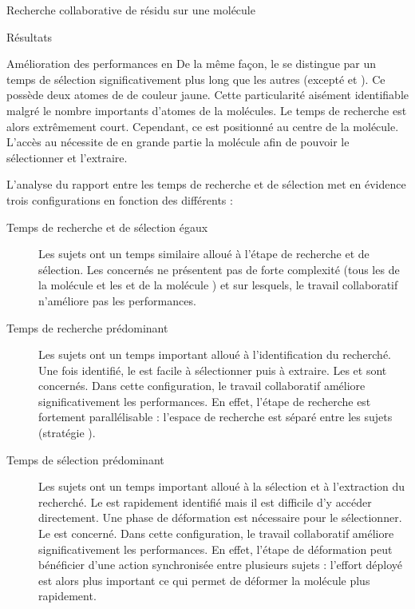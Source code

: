 \documentclass[myfrancais]{mythesis}
\begin{document}
\begin{mychapter}{Recherche collaborative de résidu sur une molécule}
\begin{mysection}{Résultats}
\begin{mysubsection}{Amélioration des performances en }
				De la même façon, le   se distingue par un temps de sélection significativement plus long que les autres  (excepté  et ).
				Ce  possède deux atomes de  de couleur jaune.
				Cette particularité aisément identifiable malgré le nombre importants d'atomes de la molécules.
				Le temps de recherche est alors extrêmement court.
				Cependant, ce  est positionné au centre de la molécule.
				L'accès au  nécessite de  en grande partie la molécule afin de pouvoir le sélectionner et l'extraire.

				L'analyse du rapport entre les temps de recherche et de sélection met en évidence trois configurations en fonction des différents  :
				\begin{description}
					\item[Temps de recherche et de sélection égaux]
						Les sujets ont un temps similaire alloué à l'étape de recherche et de sélection.
						Les  concernés ne présentent pas de forte complexité (tous les  de la molécule \myTRPCAGE et les   et  de la molécule \myPrion) et sur lesquels, le travail collaboratif n'améliore pas les performances.
					\item[Temps de recherche prédominant]
						Les sujets ont un temps important alloué à l'identification du  recherché.
						Une fois identifié, le  est facile à sélectionner puis à extraire.
						Les   et  sont concernés.
						Dans cette configuration, le travail collaboratif améliore significativement les performances.
						En effet, l'étape de recherche est fortement parallélisable : l'espace de recherche est séparé entre les sujets (stratégie ).
					\item[Temps de sélection prédominant]
						Les sujets ont un temps important alloué à la sélection et à l'extraction du  recherché.
						Le  est rapidement identifié mais il est difficile d'y accéder directement.
						Une phase de déformation est nécessaire pour le sélectionner.
						Le   est concerné.
						Dans cette configuration, le travail collaboratif améliore significativement les performances.
						En effet, l'étape de déformation peut bénéficier d'une action synchronisée entre plusieurs sujets : l'effort déployé est alors plus important ce qui permet de déformer la molécule plus rapidement.

\end{description}
\end{mysubsection}
\end{mysection}
\end{mychapter}
\end{document}
